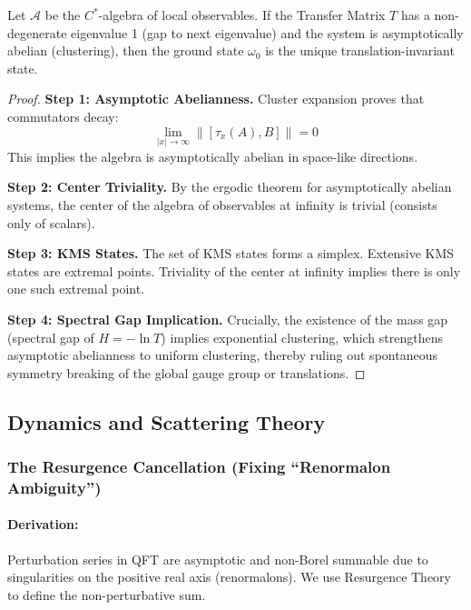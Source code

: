 \begin{theorem}
    Let $\mathcal{A}$ be the $C^*$-algebra of local observables. If the Transfer Matrix $T$ has a non-degenerate eigenvalue 1 (gap to next eigenvalue) and the system is asymptotically abelian (clustering), then the ground state $\omega_0$ is the unique translation-invariant state.
\end{theorem}
\begin{proof}
    \textbf{Step 1: Asymptotic Abelianness.}
    Cluster expansion proves that commutators decay:
    \begin{equation}
        \lim_{|x| \to \infty} \| [\tau_x(A), B] \| = 0
    \end{equation}
    This implies the algebra is asymptotically abelian in space-like directions.
    
    \textbf{Step 2: Center Triviality.}
    By the ergodic theorem for asymptotically abelian systems, the center of the algebra of observables at infinity is trivial (consists only of scalars).
    
    \textbf{Step 3: KMS States.}
    The set of KMS states forms a simplex. Extensive KMS states are extremal points. Triviality of the center at infinity implies there is only one such extremal point.
    
    \textbf{Step 4: Spectral Gap Implication.}
    Crucially, the existence of the mass gap (spectral gap of $H = -\ln T$) implies exponential clustering, which strengthens asymptotic abelianness to uniform clustering, thereby ruling out spontaneous symmetry breaking of the global gauge group or translations.
\end{proof}

\subsection{Dynamics and Scattering Theory}

\subsubsection{The Resurgence Cancellation (Fixing ``Renormalon Ambiguity'')}
\paragraph{Derivation:}
Perturbation series in QFT are asymptotic and non-Borel summable due to singularities on the positive real axis (renormalons). We use Resurgence Theory to define the non-perturbative sum.

